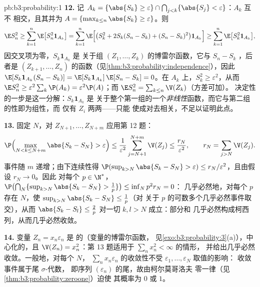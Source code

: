 \begin{solution}{pb:b3:probability:1}
\textbf{12.} 记 $A_k = \{\abs{S_k} \geq \varepsilon\} \cap
\bigcap_{j<k}\{\abs{S_j} < \varepsilon\}$：$A_k$ 互不
相交，且其并为 $A = \{\max_{k\leq n}\abs{S_k} \geq
\varepsilon\}$。则
\[
\E S_n^2 \geq \sum_{k=1}^n\E\bigl[S_n^2\mathbf 1_{A_k}\bigr]
= \sum_{k=1}^n\E\Bigl[\bigl(S_k^2 + 2S_k(S_n - S_k) + (S_n
- S_k)^2\bigr)\mathbf 1_{A_k}\Bigr]
\geq \sum_{k=1}^n\E\bigl[S_k^2\mathbf 1_{A_k}\bigr],
\]
因交叉项为零，$S_k\mathbf 1_{A_k}$ 是
关于组 $(Z_1, \dots, Z_k)$ 的博雷尔函数，它与
$S_n - S_k$ ，后者是 $(Z_{k+1},
\dots, Z_n)$ 的函数（见\cref{thm:b3:probability:independence}），因此
$\E[S_k\mathbf 1_{A_k}(S_n - S_k)] = \E[S_k\mathbf
1_{A_k}]\,\E[S_n - S_k] = 0$。在 $A_k$ 上，$S_k^2 \geq
\varepsilon^2$，从而 $\E S_n^2 \geq
\varepsilon^2\sum_k\P(A_k) = \varepsilon^2\P(A)$；而 $\E
S_n^2 = \sum_{k\leq n}\V(Z_k)$（方差可加）。
决定性的一步是这一分解：$S_k\mathbf 1_{A_k}$ 是
关于整个第一组的一个\emph{非线性}函数，而它与第二组
的性即为组性，而
仅有 $Z_i$ 两两——只能
使成对去相关，不足以证明此点。

\textbf{13.} 固定 $N$，对 $Z_{N+1},
\dots, Z_{N+m}$ 应用第 12 题：
\[
\P\Bigl(\max_{N < k \leq N+m}\abs{S_k - S_N} >
\varepsilon\Bigr) \leq
\frac1{\varepsilon^2}\sum_{j=N+1}^{N+m}\V(Z_j) \leq
\frac{r_N}{\varepsilon^2},
\qquad r_N = \sum_{j>N}\V(Z_j) .
\]
事件随 $m$ 递增；由下连续性得
$\P(\sup_{k>N}\abs{S_k - S_N} > \varepsilon) \leq
r_N/\varepsilon^2$，且由假设 $r_N \to 0$。因此
对每个 $p \in \N^*$，$\P\bigl(\bigcap_N\{\sup_{k>N}
\abs{S_k - S_N} > \frac1p\}\bigr) \leq \inf_Np^2r_N = 0$：
几乎必然地，对每个 $p$ 存在 $N$，使
$\sup_{k>N}\abs{S_k - S_N} \leq \frac1p$（对
关于 $p$ 的可数多个几乎必然事件取交），从而 $\abs{S_k -
S_l} \leq \frac2p$ 对一切 $k, l > N$ 成立：部分和
几乎必然构成柯西列，从而几乎必然收敛。

\textbf{14.} 变量 $Z_n = x_n\varepsilon_n$ 是
的（变量的博雷尔函数，
见\cref{exo:b3:probability:3}(a)），中心化的，且 $\V(Z_n) =
x_n^2$：第 13 题适用于 $\sum_nx_n^2 < \infty$ 的情形，
并给出几乎必然收敛。一般地，对每个 $N$，
$\sum_nx_n\varepsilon_n$ 的收敛性不受
$\varepsilon_1, \dots, \varepsilon_N$ 取值的影响：
收敛事件属于尾 $\sigma$-代数，
即序列 $(\varepsilon_n)$ 的尾，故由柯尔莫哥洛夫
零一律（见\cref{thm:b3:probability:zeroone}）迫使
其概率为 $0$ 或 $1$。


\end{solution}
